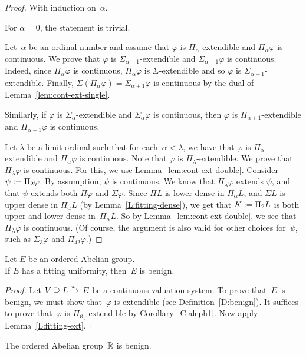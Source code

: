 \documentclass[main.tex]{subfiles}
\begin{document}
\begin{proof}
With induction on~$\alpha$.

\vspace{.3em}
For $\alpha=0$,
the statement is trivial.

\vspace{.3em}
Let~$\alpha$ be an ordinal number
and assume that $\varphi$
is $\Pi_\alpha$-extendible
and $\Pi_\alpha \varphi$ is continuous.
We prove that $\varphi$
is $\Sigma_{\alpha+1}$-extendible
and $\Sigma_{\alpha+1}\varphi$ is continuous.
Indeed,
since $\Pi_\alpha\varphi$ is continuous,
$\Pi_\alpha\varphi$ is $\Sigma$-extendible
and so $\varphi$ is $\Sigma_{\alpha+1}$-extendible.
Finally,
$\Sigma(\Pi_\alpha \varphi)=\Sigma_{\alpha+1}\varphi$
is continuous
by the dual of Lemma~\ref{lem:cont-ext-single}.

Similarly,
if $\varphi$ is $\Sigma_\alpha$-extendible
and $\Sigma_\alpha \varphi$ is continuous,
then $\varphi$
is $\Pi_{\alpha+1}$-extendible
and $\Pi_{\alpha+1}\varphi$ is continuous.

\vspace{.3em}
Let $\lambda$ be a limit ordinal
such that for each~$\alpha<\lambda$,
we have that $\varphi$ is $\Pi_\alpha$-extendible
and $\Pi_\alpha\varphi$ is continuous.
Note that $\varphi$ is $\Pi_\lambda$-extendible.
We prove that $\Pi_\lambda \varphi$ is continuous.
For this,
we use Lemma~\ref{lem:cont-ext-double}.
Consider $\psi := \Pi_2 \varphi$.
By assumption,
$\psi$ is continuous.
We know
that $\Pi_\lambda \varphi$ extends $\psi$,
and that $\psi$ extends both $\Pi\varphi$ and $\Sigma\varphi$.
Since $\Pi L$ is lower dense in $\Pi_\alpha L$,
and $\Sigma L$ is upper dense in $\Pi_\alpha L$
(by Lemma~\ref{L:fitting-dense}),
we get that $K:= \Pi_2 L$ is both upper and lower dense in~$\Pi_\alpha L$.
So by Lemma~\ref{lem:cont-ext-double},
we see that~$\Pi_\lambda\varphi$ is continuous.
(Of course, 
the argument is also valid for other choices for~$\psi$,
such as $\Sigma_3\varphi$ and $\Pi_{42} \varphi$.)
\end{proof}
%
%
\begin{thm}
\label{T:fitting-benign}
Let $E$ be an ordered Abelian group. \\
If $E$ has a fitting uniformity,
then~$E$ is benign.
\end{thm}
\begin{proof}
Let $V \supseteq L\,\smash{\xrightarrow{\varphi}\,E}$ be a continuous valuation system.
To prove that~$E$ is benign,
we must show that~$\varphi$ is extendible
(see Definition~\ref{D:benign}).
It suffices to prove that~$\varphi$ is $\Pi_{\aleph_1}$-extendible
by Corollary~\ref{C:aleph1}.
Now apply Lemma~\ref{L:fitting-ext}.
\end{proof}
\begin{cor}
\label{C:R-benign}
The ordered Abelian group~$\mathbb{R}$ is benign.
\end{cor}
\end{document}
